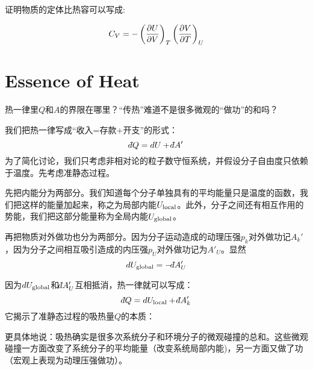 \documentclass[CJK]{beamer}
\begin{document}
\begin{frame}
\bch
{}

证明物质的定体比热容可以写成:

$$
C_V =  - \left(\frac{\partial U}{\partial V}\right)_{T} \left(\frac{\partial V}{\partial T}\right)_{U} 
$$

\ech
\end{frame}


\section{Essence of Heat}

\begin{frame}
\bch


热一律里$Q$和$A$的界限在哪里？“传热”难道不是很多微观的“做功”的和吗？

\ech
\end{frame}


\begin{frame}
\bch
我们把热一律写成“收入=存款+开支”的形式：
$$ \dbar Q =  d U + \dbar A'$$
为了简化讨论，我们只考虑非相对论的粒子数守恒系统，并假设分子自由度只依赖于温度。先考虑准静态过程。

\skipline

先把内能分为两部分。我们知道每个分子单独具有的平均能量只是温度的函数，我们把这样的能量加起来，称之为{\blue 局部内能$U_{\rm local}$}。此外，分子之间还有相互作用的势能，我们把这部分能量称为{\blue 全局内能$U_{\rm global}$}。


再把物质对外做功也分为两部分。因为分子运动造成的{\blue 动理压强$p_k$对外做功记$ A_k'$}，因为分子之间相互吸引造成的{\blue 内压强$p_U$对外做功记为$ A'_U$}。显然
{\blue
$$ d U_{\rm global} = - \dbar A'_U$$
}
\ech
\end{frame}


\begin{frame}
\bch
因为$d U_{\rm global}$和$\dbar A'_U$互相抵消，热一律就可以写成：
$$ \dbar Q = d U_{\rm local}  +\dbar A'_k  $$
它揭示了准静态过程的吸热量$Q$的本质：


更具体地说：吸热确实是很多次系统分子和环境分子的微观碰撞的总和。这些微观碰撞一方面改变了系统分子的平均能量（改变系统局部内能)，另一方面又做了功（宏观上表现为动理压强做功）。


\ech
\end{frame}
\end{document}
